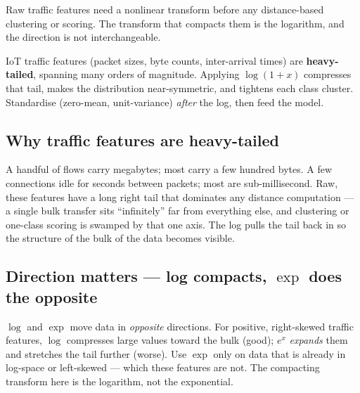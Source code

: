 \documentclass[11pt,a4paper]{article}
\begin{document}
Raw traffic features need a nonlinear transform before any distance-based clustering or scoring. The transform that compacts them is the logarithm, and the direction is not interchangeable.

\begin{tcolorbox}[idea]
IoT traffic features (packet sizes, byte counts, inter-arrival times) are \textbf{heavy-tailed}, spanning many orders of magnitude. Applying $\log(1+x)$ compresses that tail, makes the distribution near-symmetric, and tightens each class cluster. Standardise (zero-mean, unit-variance) \emph{after} the log, then feed the model.
\end{tcolorbox}

\subsection{Why traffic features are heavy-tailed}
A handful of flows carry megabytes; most carry a few hundred bytes. A few connections idle for seconds between packets; most are sub-millisecond. Raw, these features have a long right tail that dominates any distance computation --- a single bulk transfer sits ``infinitely'' far from everything else, and clustering or one-class scoring is swamped by that one axis. The log pulls the tail back in so the structure of the bulk of the data becomes visible.

\subsection{Direction matters --- log compacts, $\exp$ does the opposite}
\begin{tcolorbox}[warnbox]
$\log$ and $\exp$ move data in \emph{opposite} directions. For positive, right-skewed traffic features, $\log$ compresses large values toward the bulk (good); $e^{x}$ \emph{expands} them and stretches the tail further (worse). Use $\exp$ only on data that is already in log-space or left-skewed --- which these features are not. The compacting transform here is the logarithm, not the exponential.
\end{tcolorbox}
\end{document}

